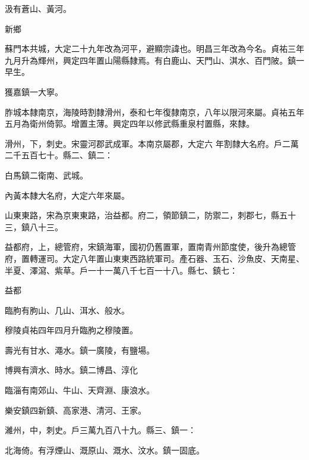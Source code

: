 \begin{pinyinscope}
 汲有蒼山、黃河。



 新鄉



 蘇門本共城，大定二十九年改為河平，避顯宗諱也。明昌三年改為今名。貞祐三年九月升為輝州，興定四年置山陽縣隸焉。有白鹿山、天門山、淇水、百門陂。鎮一早生。



 獲嘉鎮一大寧。



 胙城本隸南京，海陵時割隸滑州，泰和七年復隸南京，八年以限河來屬。貞祐五年五月為衛州倚郭。增置主薄。興定四年以修武縣重泉村置縣，來隸。



 滑州，下，刺史。宋靈河郡武成軍。本南京屬郡，大定六
 年割隸大名府。戶二萬二千五百七十。縣二、鎮二：



 白馬鎮二衛南、武城。



 內黃本隸大名府，大定六年來屬。



 山東東路，宋為京東東路，治益都。府二，領節鎮二，防禦二，刺郡七，縣五十三，鎮八十三。



 益都府，上，總管府，宋鎮海軍，國初仍舊置軍，置南青州節度使，後升為總管府，置轉運司。大定八年置山東東西路統軍司。產石器、玉石、沙魚皮、天南星、半夏、澤瀉、紫草。戶一十一萬八千七百一十八。縣七、鎮七：



 益都



 臨朐有朐山、几山、洱水、般水。



 穆陵貞祐四年四月升臨朐之穆陵置。



 壽光有甘水、澠水。鎮一廣陵，有鹽場。



 博興有濟水、時水。鎮二博昌、淳化



 臨淄有南郊山、牛山、天齊淵、康浪水。



 樂安鎮四新鎮、高家港、清河、王家。



 濰州，中，刺史。戶三萬九百八十九。縣三、鎮一：



 北海倚。有浮煙山、溉原山、溉水、汶水。鎮一固底。




\end{pinyinscope}
